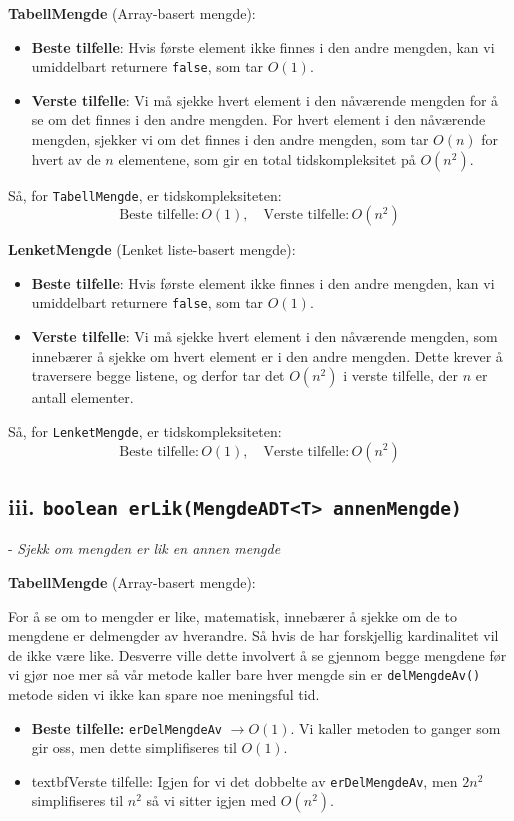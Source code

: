 \documentclass[12pt]{article}
\begin{document}
\textbf{TabellMengde} (Array-basert mengde):
\begin{itemize}
    \item \textbf{Beste tilfelle}: Hvis første element ikke finnes i den andre mengden, kan vi umiddelbart returnere \texttt{false}, som tar \(O(1)\).
    \item \textbf{Verste tilfelle}: Vi må sjekke hvert element i den nåværende mengden for å se om det finnes i den andre mengden. For hvert element i den nåværende mengden, sjekker vi om det finnes i den andre mengden, som tar \(O(n)\) for hvert av de \(n\) elementene, som gir en total tidskompleksitet på \(O(n^2)\).
\end{itemize}

Så, for \texttt{TabellMengde}, er tidskompleksiteten:
\[
\text{Beste tilfelle}: O(1), \quad \text{Verste tilfelle}: O(n^2)
\]

\textbf{LenketMengde} (Lenket liste-basert mengde):
\begin{itemize}
    \item \textbf{Beste tilfelle}: Hvis første element ikke finnes i den andre mengden, kan vi umiddelbart returnere \texttt{false}, som tar \(O(1)\).
    \item \textbf{Verste tilfelle}: Vi må sjekke hvert element i den nåværende mengden, som innebærer å sjekke om hvert element er i den andre mengden. Dette krever å traversere begge listene, og derfor tar det \(O(n^2)\) i verste tilfelle, der \(n\) er antall elementer.
\end{itemize}

Så, for \texttt{LenketMengde}, er tidskompleksiteten:
\[
\text{Beste tilfelle}: O(1), \quad \text{Verste tilfelle}: O(n^2)
\]

\subsection*{iii. \texttt{boolean erLik(MengdeADT<T> annenMengde)}} - \textit{Sjekk om mengden er lik en annen mengde}

\noindent
\textbf{TabellMengde} (Array-basert mengde):

\noindent 
For å se om to mengder er like, matematisk, innebærer å sjekke om de to mengdene 
        er delmengder av hverandre. Så hvis de har forskjellig kardinalitet 
        vil de ikke være like. Desverre ville dette involvert å se gjennom begge 
        mengdene før vi gjør noe mer så vår metode kaller bare hver mengde sin 
        er \texttt{delMengdeAv()} metode siden vi ikke kan spare noe meningsful tid.  
\begin{itemize}
    \item \textbf{Beste tilfelle:} \texttt{erDelMengdeAv} \(\rightarrow O(1)\). 
        Vi kaller metoden to ganger som gir oss, men dette simplifiseres til \(O(1)\). 
    \item textbf{Verste tilfelle:} Igjen for vi det dobbelte av \texttt{erDelMengdeAv},
        men \(2n^2\) simplifiseres til \(n^2\) så vi sitter igjen med \(O(n^2)\).

\end{itemize}
\end{document}
